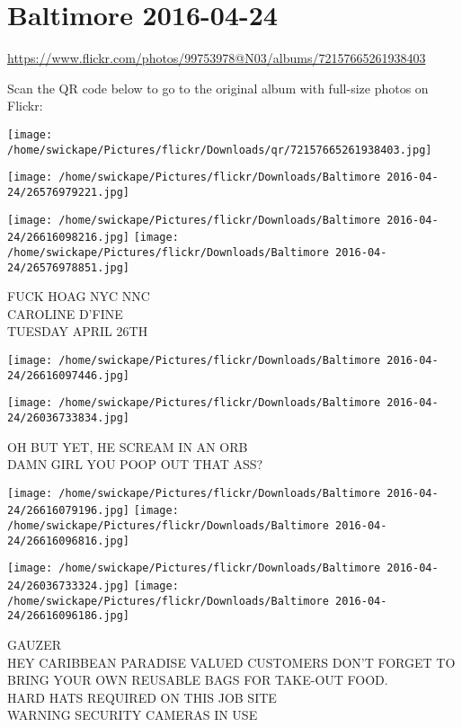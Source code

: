 \documentclass[10pt,letterpaper]{article}
\title{}
\author{}
\date{}
\begin{document}
\section*{Baltimore 2016-04-24}

\url{https://www.flickr.com/photos/99753978@N03/albums/72157665261938403}

Scan the QR code below to go to the original album with full-size photos on Flickr:

\texttt{[image: /home/swickape/Pictures/flickr/Downloads/qr/72157665261938403.jpg]}
\pagebreak

\texttt{[image: /home/swickape/Pictures/flickr/Downloads/Baltimore 2016-04-24/26576979221.jpg]}

\vspace{0.25in}
\texttt{[image: /home/swickape/Pictures/flickr/Downloads/Baltimore 2016-04-24/26616098216.jpg]}
\texttt{[image: /home/swickape/Pictures/flickr/Downloads/Baltimore 2016-04-24/26576978851.jpg]}

FUCK HOAG NYC NNC\\
CAROLINE D'FINE\\
TUESDAY APRIL 26TH
\pagebreak

\texttt{[image: /home/swickape/Pictures/flickr/Downloads/Baltimore 2016-04-24/26616097446.jpg]}

\vspace{0.25in}
\texttt{[image: /home/swickape/Pictures/flickr/Downloads/Baltimore 2016-04-24/26036733834.jpg]}

OH BUT YET, HE SCREAM IN AN ORB\\
DAMN GIRL YOU POOP OUT THAT ASS?
\pagebreak

\texttt{[image: /home/swickape/Pictures/flickr/Downloads/Baltimore 2016-04-24/26616079196.jpg]}
\texttt{[image: /home/swickape/Pictures/flickr/Downloads/Baltimore 2016-04-24/26616096816.jpg]}

\texttt{[image: /home/swickape/Pictures/flickr/Downloads/Baltimore 2016-04-24/26036733324.jpg]}
\texttt{[image: /home/swickape/Pictures/flickr/Downloads/Baltimore 2016-04-24/26616096186.jpg]}

GAUZER\\
HEY CARIBBEAN PARADISE VALUED CUSTOMERS DON'T FORGET TO BRING YOUR OWN REUSABLE BAGS FOR TAKE{-}OUT FOOD.\\
HARD HATS REQUIRED ON THIS JOB SITE\\
WARNING SECURITY CAMERAS IN USE
\pagebreak
\end{document}
